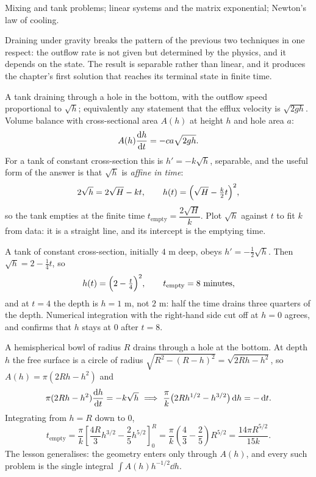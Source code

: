 \begin{seealsob}Mixing and tank problems; linear systems and the matrix exponential; Newton's law of cooling.\end{seealsob}

Draining under gravity breaks the pattern of the previous two techniques in one respect: the outflow rate is not given but determined by the physics, and it depends on the state. The result is separable rather than linear, and it produces the chapter's first solution that reaches its terminal state in finite time.

\cue A tank draining through a hole in the bottom, with the outflow speed proportional to $\sqrt{h}$; equivalently any statement that the efflux velocity is $\sqrt{2gh}$.
\method Volume balance with cross-sectional area $A(h)$ at height $h$ and hole area $a$:
\[A(h)\frac{\mathrm{d}h}{\mathrm{d}t}=-ca\sqrt{2gh}.\]
For a tank of constant cross-section this is $h'=-k\sqrt h$, separable, and the useful form of the answer is that $\sqrt h$ is \emph{affine in time}:
\[2\sqrt h=2\sqrt{H}-kt,\qquad h(t)=\Bigl(\sqrt H-\tfrac k2t\Bigr)^{2},\]
so the tank empties at the finite time $t_{\text{empty}}=\dfrac{2\sqrt H}{k}$. Plot $\sqrt h$ against $t$ to fit $k$ from data: it is a straight line, and its intercept is the emptying time.

\begin{worked}
A tank of constant cross-section, initially $4$ m deep, obeys $h'=-\tfrac12\sqrt h$. Then $\sqrt h=2-\tfrac14t$, so
\[h(t)=\Bigl(2-\tfrac t4\Bigr)^{2},\qquad t_{\text{empty}}=8\ \text{minutes},\]
and at $t=4$ the depth is $h=1$ m, not $2$ m: half the time drains three quarters of the depth. Numerical integration with the right-hand side cut off at $h=0$ agrees, and confirms that $h$ stays at $0$ after $t=8$.
\end{worked}

\begin{worked}
A hemispherical bowl of radius $R$ drains through a hole at the bottom. At depth $h$ the free surface is a circle of radius $\sqrt{R^{2}-(R-h)^{2}}=\sqrt{2Rh-h^{2}}$, so $A(h)=\pi(2Rh-h^{2})$ and
\[\pi(2Rh-h^{2})\dv{h}{t}=-k\sqrt h\ \Longrightarrow\ \frac{\pi}{k}\bigl(2Rh^{1/2}-h^{3/2}\bigr)\dd h=-\dd t.\]
Integrating from $h=R$ down to $0$,
\[t_{\text{empty}}=\frac{\pi}{k}\left[\frac{4R}{3}h^{3/2}-\frac{2}{5}h^{5/2}\right]_{0}^{R}=\frac{\pi}{k}\left(\frac43-\frac25\right)R^{5/2}=\frac{14\pi R^{5/2}}{15k}.\]
The lesson generalises: the geometry enters only through $A(h)$, and every such problem is the single integral $\int A(h)h^{-1/2}\dd h$.
\end{worked}

